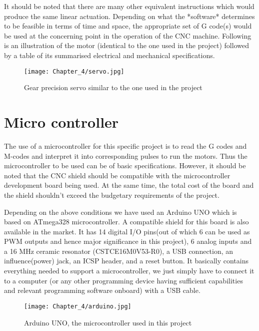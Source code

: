 It should be noted that there are many other equivalent instructions which would produce the same linear actuation. Depending on what the *software* determines to be feasible in terms of time and space, the appropriate set of G code(s) would be used at the concerning point in the operation of the CNC machine. Following is an illustration of the motor (identical to the one used in the project) followed by a table of its summarised electrical and mechanical specifications.

\begin{figure}[h]
 \centering
 \texttt{[image: Chapter\_4/servo.jpg]}
 \caption{Gear precision servo similar to the one used in the project}
 \label{fig:servo}
\end{figure}


\section{Micro controller}

The use of a microcontroller for this specific project is to read the G codes and M-codes and interpret it into corresponding pulses to run the motors. Thus the microcontroller to be used can be of basic specifications. However, it should be noted that the CNC shield should be compatible with the microcontroller development board being used. At the same time, the total cost of the board and the shield shouldn’t exceed the budgetary requirements of the project. \par

Depending on the above conditions we have used an Arduino UNO which is based on ATmega328 microcontroller. A compatible shield for this board is also available in the market. It has 14 digital I/O pins(out of which 6 can be used as PWM outputs and hence major significance in this project), 6 analog inputs and a 16 MHz ceramic resonator (CSTCE16M0V53-R0), a USB connection, an influence(power) jack, an ICSP header, and a reset button. It basically contains everything needed to support a microcontroller, we just simply have to connect it to a computer (or any other programming device having sufficient capabilities and relevant programming software onboard) with a USB cable.

\begin{figure}[h]
 \centering
 \texttt{[image: Chapter\_4/arduino.jpg]}
 \caption{Arduino UNO, the microcontroller used in this project}
 \label{fig:arduino}
\end{figure}

